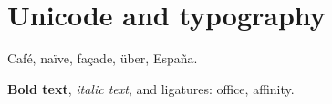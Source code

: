 \documentclass{article}
\begin{document}
\section{Unicode and typography}
Café, naïve, façade, über, España.\par
\textbf{Bold text}, \textit{italic text}, and ligatures: office, affinity.
\end{document}
